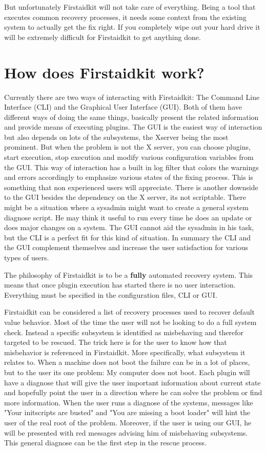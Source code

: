 \documentclass[a4paper,13pt]{article}
\begin{document}
But unfortunately Firstaidkit will not take care of everything.  Being a tool that
executes common recovery processes, it needs some context from the existing system
to actually get the fix right.  If you completely wipe out your hard drive it will
be extremely difficult for Firstaidkit to get anything done.

\section{How does Firstaidkit work?}
Currently there are two ways of interacting with Firstaidkit: The Command Line Interface
(CLI) and the Graphical User Interface (GUI).  Both of them have different ways of doing
the same things, basically present the related information and provide means of executing
plugins.  The GUI is the easiest way of interaction but also depends on lots of the
subsystems, the Xserver being the most prominent.  But when the problem is not the X
server, you can choose plugins, start execution, stop execution and modify various
configuration variables from the GUI.  This way of interaction has a built in log filter
that colors the warnings and errors accordingly to emphasize various states of the fixing
process.  This is something that non experienced users will appreciate.  There is another
downside to the GUI besides the dependency on the X server, its not scriptable.  There
might be a situation where a sysadmin might want to create a general system diagnose
script.  He may think it useful to run every time he does an update or does major changes
on a system.  The GUI cannot aid the sysadmin in his task, but the CLI is a perfect fit
for this kind of situation.  In summary the CLI and the GUI complement themselves and
increase the user satisfaction for various types of users.

The philosophy of Firstaidkit is to be a \textbf{fully} automated recovery system.  This
means that once plugin execution has started there is no user interaction.  Everything
must be specified in the configuration files, CLI or GUI.

Firstaidkit can be considered a list of recovery processes used to recover default value
behavior.  Most of the time the user will not be looking to do a full system check.  Instead
a specific subsystem is identified as misbehaving and therefor targeted to be rescued. 
The trick here is for the user to know how that misbehavior is referenced in Firstaidkit.
More specifically, what subsystem it relates to.  When a machine does not boot the failure
can be in a lot of places, but to the user its one problem: My computer does not boot.  Each
plugin will have a diagnose that will give the user important information about current state
and hopefully point the user in a direction where he can solve the problem or find more
information.  When the user runs a diagnose of the systems, messages like "Your initscripts are
busted" and "You are missing a boot loader" will hint the user of the real root of the problem.
Moreover, if the user is using our GUI, he will be presented with red messages advising him
of misbehaving subsystems.  This general diagnose can be the first step in the rescue process.
\end{document}
